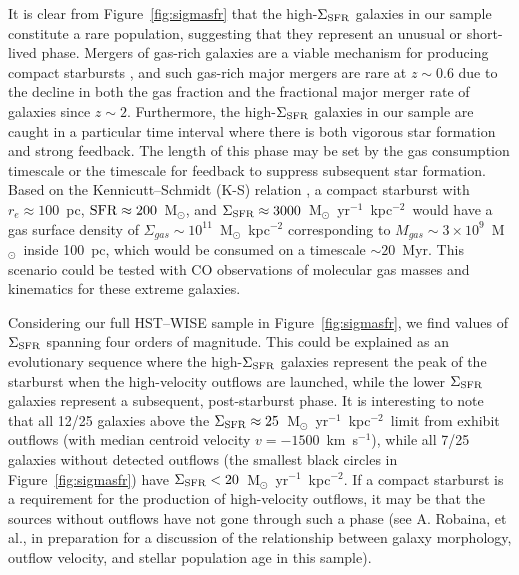 \documentclass[apj]{emulateapj}
\newcommand{\kms}{km~s$^{-1}$}
\newcommand{\msun}{M$_{\odot}$}
\newcommand{\units}{M$_{\odot}$~yr$^{-1}$~kpc$^{-2}$}
\newcommand{\sigmasfr}{\Sigma_{\textnormal{\scriptsize{SFR}}}}
\begin{document}
It is clear from Figure~\ref{fig:sigmasfr} that the high-$\sigmasfr$
galaxies in our sample constitute a rare population, suggesting that
they represent an unusual or short-lived phase.  Mergers of gas-rich
galaxies are a viable mechanism for producing compact starbursts
\citep{mih96}, and such gas-rich major mergers are rare at $z\sim0.6$
due to the decline in both the gas fraction \citep{tac10} and the
fractional major merger rate \citep{lot11} of galaxies since $z\sim2$.
Furthermore, the high-$\sigmasfr$ galaxies in our sample are caught in
a particular time interval where there is both vigorous star formation
and strong feedback.  The length of this phase may be set by the gas
consumption timescale or the timescale for feedback to suppress
subsequent star formation.  Based on the Kennicutt--Schmidt (K-S)
relation \citep{ken98}, a compact starburst with $r_e\approx100$~pc,
$\textnormal{SFR}\approx200$~\msun, and
$\sigmasfr\approx3000$~\units\ would have a gas surface density of
$\Sigma_{gas}\sim10^{11}$~\msun~kpc$^{-2}$ corresponding to
$M_{gas}\sim3\times10^{9}$~\msun\ inside 100~pc, which would be
consumed on a timescale $\sim20$~Myr.  This scenario could be tested
with CO observations of molecular gas masses and kinematics for these
extreme galaxies.


Considering our full HST--WISE sample in Figure~\ref{fig:sigmasfr}, we
find values of $\sigmasfr$ spanning four orders of magnitude.  This
could be explained as an evolutionary sequence where the
high-$\sigmasfr$ galaxies represent the peak of the starburst when the
high-velocity outflows are launched, while the lower $\sigmasfr$
galaxies represent a subsequent, post-starburst phase.  It is
interesting to note that all 12/25 galaxies above the
$\sigmasfr\approx25$~\units\ limit from \citet{meu97} exhibit outflows
(with median centroid velocity $v=-1500$~\kms), while all 7/25
galaxies without detected outflows (the smallest black circles in
Figure~\ref{fig:sigmasfr}) have $\sigmasfr<20$~\units.  If a compact
starburst is a requirement for the production of high-velocity
outflows, it may be that the sources without outflows have not gone
through such a phase (see A. Robaina, et al., in preparation for a
discussion of the relationship between galaxy morphology, outflow
velocity, and stellar population age in this sample).
\end{document}
